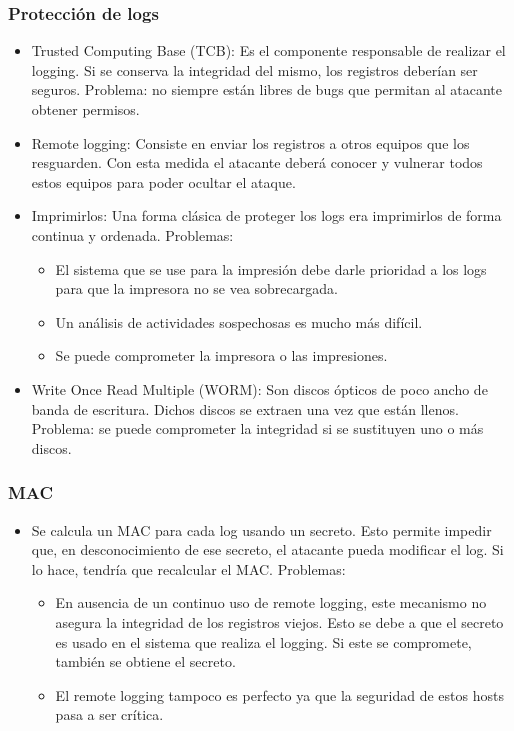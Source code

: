 \documentclass[10pt, a4paper,english,spanish]{beamer}
\begin{document}
\begin{frame}
\frametitle{Protección de logs}
\begin{itemize}
\item Trusted Computing Base (TCB): Es el componente responsable de realizar el logging. Si se conserva
la integridad del mismo, los registros deberían ser seguros. Problema: no siempre están libres de bugs que
permitan al atacante obtener permisos.
\item Remote logging: Consiste en enviar los registros a otros equipos que los resguarden. Con esta medida
el atacante deberá conocer y vulnerar todos estos equipos para poder ocultar el ataque.
\item Imprimirlos: Una forma clásica de proteger los logs era imprimirlos de forma continua y ordenada.
Problemas:
\begin{itemize}
\item El sistema que se use para la impresión debe darle prioridad a los logs para que la impresora no
se vea sobrecargada.
\item Un análisis de actividades sospechosas es mucho más difícil.
\item Se puede comprometer la impresora o las impresiones.
\end{itemize}
\item Write Once Read Multiple (WORM): Son discos ópticos de poco ancho de banda de escritura. Dichos discos
se extraen una vez que están llenos. Problema: se puede comprometer la integridad si se sustituyen uno
o más discos.
\end{itemize}
\end{frame}

\begin{frame}
\frametitle{MAC}
\begin{itemize}
\item Se calcula un MAC para cada log usando un secreto. Esto permite impedir que, en desconocimiento de ese secreto,
el atacante pueda modificar el log. Si lo hace, tendría que recalcular el MAC. Problemas:
\begin{itemize}
  \item En ausencia de un continuo uso de remote logging, este mecanismo no asegura la integridad de los
  registros viejos. Esto se debe a que el secreto es usado en el sistema que realiza el logging. Si este
  se compromete, también se obtiene el secreto.
  \item El remote logging tampoco es perfecto ya que la seguridad de estos hosts pasa a ser crítica.
\end{itemize}
\end{itemize}
\end{frame}
\end{document}
